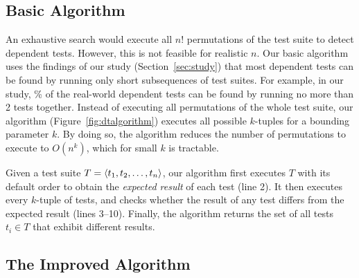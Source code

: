 \subsection{Basic Algorithm}
\label{sec:basic}

An exhaustive search would execute all $n!$
permutations of the test suite to detect dependent tests.
However, this is not feasible for realistic $n$.
Our basic algorithm uses the findings of our study
(Section~\ref{sec:study})
that most dependent tests can be found by running only short
subsequences of test suites. For example,
in our study, \todo{}\% of the real-world dependent tests
can be found by running no more than 2 tests together.
Instead of executing all permutations of the
whole test suite, our algorithm (Figure~\ref{fig:dtalgorithm})
executes all possible $k$-tuples for a bounding
parameter $k$.
By doing so, the algorithm reduces
the number of permutations to execute
to $O(n^k)$, which for small $k$ is tractable. 


Given a test suite $T =  \langle t_1, t_2, \ldots, t_n \rangle $, our algorithm
first executes $T$ with its default order
to obtain the \emph{expected result} of each test (line 2). 
It then executes every $k$-tuple of tests,
and checks whether the result of any test differs
from the expected result (lines 3--10). Finally, the algorithm returns the set
of all tests $t_i \in T$
that exhibit different results.





\subsection{The Improved Algorithm}
\label{sec:advalgorithm}

